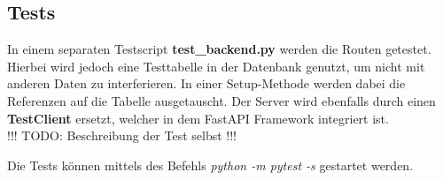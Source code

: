 \subsection{Tests}
In einem separaten Testscript \textbf{test\_backend.py} werden die Routen getestet. 
Hierbei wird jedoch eine Testtabelle in der Datenbank genutzt, um nicht mit anderen Daten zu interferieren. 
In einer Setup-Methode werden dabei die Referenzen auf die Tabelle ausgetauscht. 
Der Server wird ebenfalls durch einen \textbf{TestClient} ersetzt, welcher in dem FastAPI Framework integriert ist.\\

!!! TODO: Beschreibung der Test selbst !!!

Die Tests können mittels des Befehls \textit{python -m pytest -s} gestartet werden.
